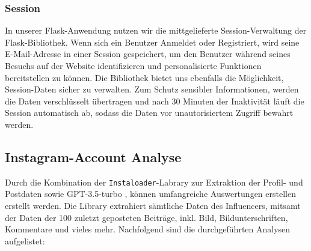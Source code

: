 \documentclass[conference,a4paper,flushend]{cs-techrep}
\begin{document}
\subsubsection{Session}
In unserer Flask-Anwendung nutzen wir die mittgelieferte Session-Verwaltung der Flask-Bibliothek. Wenn sich ein Benutzer Anmeldet oder Registriert, wird seine E-Mail-Adresse in einer Session gespeichert, um den Benutzer während seines Besuchs auf der Website identifizieren und personalisierte Funktionen bereitstellen zu können. Die Bibliothek bietet uns ebenfalls die Möglichkeit, Session-Daten sicher zu verwalten. Zum Schutz sensibler Informationen, werden die Daten verschlüsselt übertragen und nach 30 Minuten der Inaktivität läuft die Session automatisch ab, sodass die Daten vor unautorisiertem Zugriff bewahrt werden. 


\subsection{Instagram-Account Analyse}
Durch die Kombination der \texttt{Instaloader}-Labrary \cite{noauthor_instaloader_nodate} zur Extraktion der Profil- und Postdaten sowie GPT-3.5-turbo \cite{noauthor_openai_gpt-3-5-turbo}, können umfangreiche Auswertungen erstellen erstellt werden. Die Library extrahiert sämtliche Daten des Influencers, mitsamt der Daten der 100 zuletzt geposteten Beiträge, inkl. Bild, Bildunterschriften, Kommentare und vieles mehr. Nachfolgend sind die durchgeführten Analysen aufgelistet:
\end{document}
